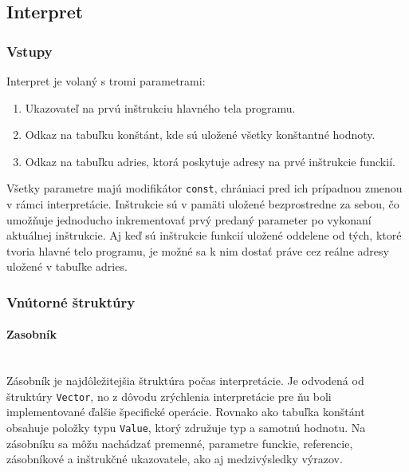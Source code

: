 \documentclass[12pt,a4paper,titlepage,final]{article}
\begin{document}
\subsection{Interpret}

\subsubsection{Vstupy}
Interpret je volaný s tromi parametrami:
\begin{enumerate}
    \itemsep0em
    \item Ukazovateľ na prvú inštrukciu hlavného tela programu.
    \item Odkaz na tabuľku konštánt, kde sú uložené všetky konštantné hodnoty.
    \item Odkaz na tabuľku adries, ktorá poskytuje adresy na prvé inštrukcie funckií.
\end{enumerate}
Všetky parametre majú modifikátor \texttt{const}, chrániaci pred ich prípadnou zmenou
v rámci interpretácie. Inštrukcie sú v pamäti uložené bezprostredne za sebou, čo
umožňuje jednoducho inkrementovať prvý predaný parameter po vykonaní aktuálnej
inštrukcie. Aj keď sú inštrukcie funkcií uložené oddelene od tých, ktoré tvoria hlavné
telo programu, je možné sa k nim dostať práve cez reálne adresy uložené v tabuľke adries.

\subsubsection{Vnútorné štruktúry}

\paragraph{Zasobník}\mbox{}\\

Zásobník je najdôležitejšia štruktúra počas interpretácie. Je odvodená od štruktúry
\texttt{Vector}, no z dôvodu zrýchlenia interpretácie pre ňu boli implementované ďalšie
špecifické operácie. Rovnako ako tabuľka konštánt obsahuje položky typu \texttt{Value}, 
ktorý združuje typ a samotnú hodnotu. Na zásobníku sa môžu nachádzať premenné, parametre
funckie, referencie, zásobníkové a inštrukčné ukazovatele, ako aj medzivýsledky výrazov.
\end{document}
